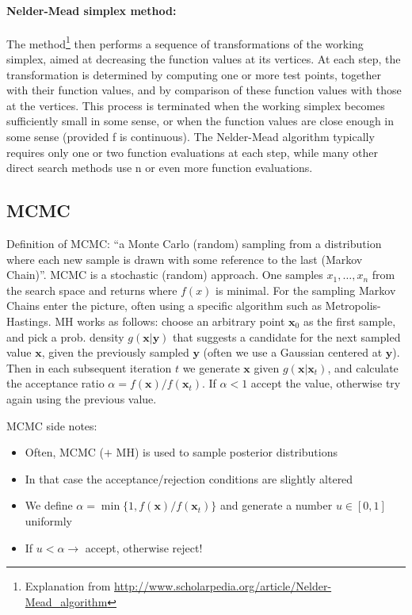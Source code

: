 \documentclass[a4paper]{article}
\begin{document}
\paragraph{Nelder-Mead simplex method: } 	The method\footnote{Explanation from \url{http://www.scholarpedia.org/article/Nelder-Mead_algorithm}} then performs a sequence of transformations of the working simplex, aimed at decreasing the function values at its vertices. At each step, the transformation is determined by computing one or more test points, together with their function values, and by comparison of these function values with those at the vertices. This process is terminated when the working simplex becomes sufficiently small in some sense, or when the function values are close enough in some sense (provided f is continuous). The Nelder-Mead algorithm typically requires only one or two function evaluations at each step, while many other direct search methods use n or even more function evaluations.

\subsection{MCMC}

Definition of MCMC: ``a Monte Carlo (random) sampling from a distribution where each new sample is drawn with some reference to the last (Markov Chain)''. MCMC is a stochastic (random) approach. One samples $x_1,\dots,x_n$ from the search space and returns where $f(x)$ is minimal. For the sampling Markov Chains enter the picture, often using a specific algorithm such as Metropolis-Hastings. MH works as follows: choose an arbitrary point $\mathbf{x}_0$ as the first sample, and pick a prob. density $g(\mathbf{x}|\mathbf{y})$ that suggests a candidate for the next sampled value $\mathbf{x}$, given the previously sampled $\mathbf{y}$ (often we use a Gaussian centered at $\mathbf{y}$). Then in each subsequent iteration $t$ we generate $\mathbf{x}$ given $g(\mathbf{x}|\mathbf{x}_t)$, and calculate the acceptance ratio $\alpha=f(\mathbf{x})/f(\mathbf{x}_t)$. If $\alpha < 1$ accept the value, otherwise try again using the previous value.

\bigskip

MCMC side notes:

\begin{itemize}
    \item Often, MCMC ($+$ MH) is used to sample posterior distributions
    \item In that case the acceptance/rejection conditions are slightly altered
    \item We define $\alpha=\min\{1, f(\mathbf{x})/f(\mathbf{x}_t)\}$ and generate a number $u\in [0, 1]$ uniformly
    \item If $u<\alpha\rightarrow$ accept, otherwise reject! 
\end{itemize}
\end{document}
